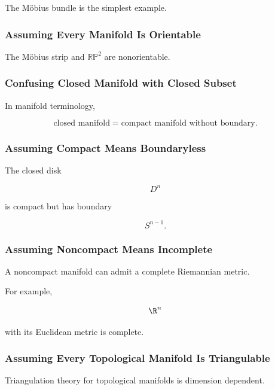 The M\"obius bundle is the simplest example.

\subsubsection{Assuming Every Manifold Is Orientable}

The M\"obius strip and \(\mathbb{RP}^2\) are nonorientable.

\subsubsection{Confusing Closed Manifold with Closed Subset}

In manifold terminology,

\[
\boxed{
\text{closed manifold}
=
\text{compact manifold without boundary}.
}
\]

\subsubsection{Assuming Compact Means Boundaryless}

The closed disk

\[
D^n
\]

is compact but has boundary

\[
S^{n-1}.
\]

\subsubsection{Assuming Noncompact Means Incomplete}

A noncompact manifold can admit a complete Riemannian metric.

For example,

\[
\R^n
\]

with its Euclidean metric is complete.

\subsubsection{Assuming Every Topological Manifold Is Triangulable}

Triangulation theory for topological manifolds is dimension dependent.

